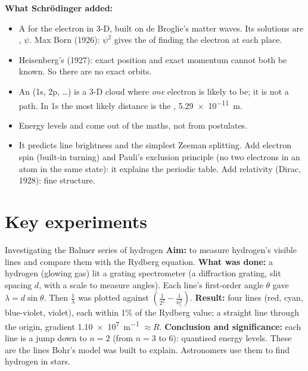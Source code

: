 \textbf{What Schrödinger added:}
\begin{itemize}
  \item A  for the electron in 3-D, built on de Broglie's matter waves. Its
        solutions are , $\psi$. Max Born (1926): $\psi^2$ gives the
         of finding the electron at each place.
  \item Heisenberg's  (1927): exact position and exact momentum
        cannot both be known. So there are no exact orbits.
  \item An  (1s, 2p, \ldots) is a 3-D cloud where \emph{one} electron is likely to
        be; it is not a path. In 1s the most likely distance is the ,
        \qty{5.29e-11}{m}.
  \item Energy levels and  come out of the maths, not from postulates.
  \item It predicts line brightness and the simplest Zeeman splitting. Add electron spin
        (built-in turning) and Pauli's exclusion principle (no two electrons in an atom in the
        same state): it explains the periodic table. Add relativity (Dirac, 1928): fine structure.
\end{itemize}

\section{Key experiments}\label{ch3:sec:experiments}

\begin{experiment}{Investigating the Balmer series of hydrogen}
\textbf{Aim:} to measure hydrogen's visible lines and compare them with the Rydberg equation.
\textbf{What was done:} a hydrogen  (glowing gas) lit a grating
spectrometer (a diffraction grating, slit spacing $d$, with a scale to measure angles). Each
line's first-order angle $\theta$ gave $\lambda = d\sin\theta$. Then $\frac{1}{\lambda}$ was
plotted against $\left(\frac{1}{2^2} - \frac{1}{n_\mathrm{i}^2}\right)$. \textbf{Result:} four
lines (red, cyan, blue-violet, violet), each within 1\% of the Rydberg value; a straight line
through the origin, gradient \qty{1.10e7}{m^{-1}} $\approx R$. \textbf{Conclusion and
significance:} each line is a jump down to $n = 2$ (from $n = 3$ to 6): quantised energy
levels. These are the lines Bohr's model was built to explain. Astronomers use them to find
hydrogen in stars.
\end{experiment}

